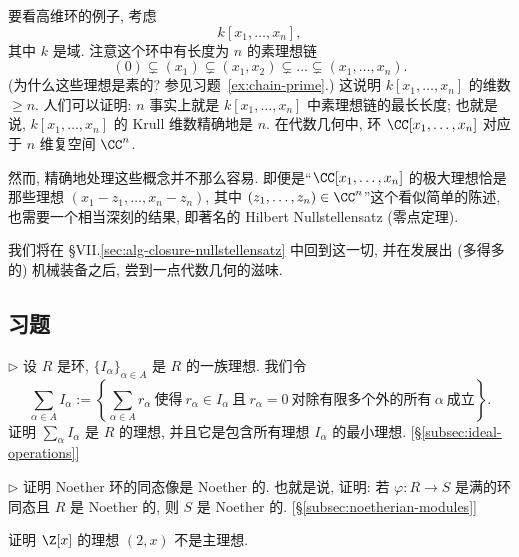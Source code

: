 \begin{example}
\label{ex:higher-dimension}
要看高维环的例子, 考虑
\[
k[x_1, \ldots, x_n],
\]
其中 $k$ 是域. 注意这个环中有长度为 $n$ 的素理想链
\[
(0) \subsetneq (x_1) \subsetneq (x_1, x_2) \subsetneq \dots \subsetneq (x_1, \dots, x_n).
\]
(为什么这些理想是素的? 参见习题~\ref{ex:chain-prime}.) 这说明 $k[x_1, \ldots, x_n]$ 的维数 $\geq n$. 人们可以证明: $n$ 事实上就是 $k[x_1, \ldots, x_n]$ 中素理想链的最长长度; 也就是说, $k[x_1, \ldots, x_n]$ 的 Krull 维数精确地是 $n$. 在代数几何中, 环 $\CC[x_1, \ldots, x_n]$ 对应于 $n$ 维复空间 $\CC^n$.

然而, 精确地处理这些概念并不那么容易. 即便是``$\CC[x_1, \ldots, x_n]$ 的极大理想恰是那些理想 $(x_1 - z_1, \ldots, x_n - z_n)$, 其中 $(z_1, \ldots, z_n) \in \CC^n$''这个看似简单的陈述, 也需要一个相当深刻的结果, 即著名的 Hilbert Nullstellensatz (零点定理).

我们将在 \S VII.\ref{sec:alg-closure-nullstellensatz} 中回到这一切, 并在发展出 (多得多的) 机械装备之后, 尝到一点代数几何的滋味.
\end{example}

\subsection*{习题}
{}

\begin{prob}
\label{ex:sum-ideals}
$\triangleright$ 设 $R$ 是环, $\{I_{\alpha}\}_{\alpha \in A}$ 是 $R$ 的一族理想. 我们令
\[
\sum_{\alpha \in A} I_{\alpha} := \left\{\sum_{\alpha \in A} r_{\alpha} \ \text{使得}\ r_{\alpha} \in I_{\alpha}\ \text{且}\ r_{\alpha} = 0\ \text{对除有限多个外的所有}\ \alpha\ \text{成立}\right\}.
\]
证明 $\sum_{\alpha} I_{\alpha}$ 是 $R$ 的理想, 并且它是包含所有理想 $I_{\alpha}$ 的最小理想. [\S\ref{subsec:ideal-operations}]
\end{prob}

\begin{prob}
\label{ex:noetherian-image}
$\triangleright$ 证明 Noether 环的同态像是 Noether 的. 也就是说, 证明: 若 $\varphi : R \to S$ 是满的环同态且 $R$ 是 Noether 的, 则 $S$ 是 Noether 的. [\S\ref{subsec:noetherian-modules}]
\end{prob}

\begin{prob}
\label{ex:2x-not-principal}
证明 $\Z[x]$ 的理想 $(2, x)$ 不是主理想.
\end{prob}

